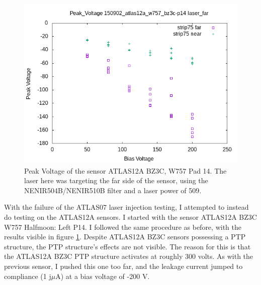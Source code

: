 \documentclass{report}
\begin{document}
            \begin{figure}[h] 
                \includegraphics[height=.4\textheight]{Peak_Voltage__150902_atlas12a_w757_bz3c-p14__laser_far}
                \centering
                \caption{ Peak Voltage of the sensor ATLAS12A BZ3C, W757 Pad 14. The laser here was targeting the far side of the sensor, using the NENIR504B/NENIR510B filter and a laser power of 509. }
                \label{fig:Peak_Voltage__150902_atlas12a_w757_bz3c-p14__laser_far}
            \end{figure}

            With the failure of the ATLAS07 laser injection testing, I attempted to instead do testing on the ATLAS12A sensors. I started with the sensor ATLAS12A BZ3C W757 Halfmoon: Left P14. I followed the same procedure as before, with the results visible in figure \ref{fig:Peak_Voltage__150902_atlas12a_w757_bz3c-p14__laser_far}. Despite ATLAS12A BZ3C sensors possessing a PTP structure, the PTP structure's effects are not visible. The reason for this is that the ATLAS12A BZ3C PTP structure activates at roughly 300 volts. As with the previous sensor, I pushed this one too far, and the leakage current jumped to compliance (1 j$\mu$A) at a bias voltage of -200 V.
\end{document}
